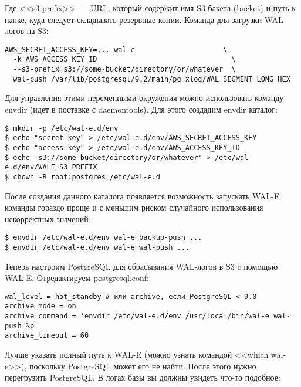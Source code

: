 Где <<s3-prefix>>~--- URL, который содержит имя S3 бакета (bucket) и путь к папке, куда следует складывать резервные копии. Команда для загрузки WAL-логов на S3:

\begin{lstlisting}[label=lst:wal-e4,caption=Загрузка WAL-логов на S3]
AWS_SECRET_ACCESS_KEY=... wal-e                     \
  -k AWS_ACCESS_KEY_ID                                \
  --s3-prefix=s3://some-bucket/directory/or/whatever  \
  wal-push /var/lib/postgresql/9.2/main/pg_xlog/WAL_SEGMENT_LONG_HEX
\end{lstlisting}

Для управления этими переменными окружения можно использовать команду envdir (идет в поставке с daemontools). Для этого создадим envdir каталог:

\begin{lstlisting}[label=lst:wal-e5,caption=WAL-E с envdir]
$ mkdir -p /etc/wal-e.d/env
$ echo "secret-key" > /etc/wal-e.d/env/AWS_SECRET_ACCESS_KEY
$ echo "access-key" > /etc/wal-e.d/env/AWS_ACCESS_KEY_ID
$ echo 's3://some-bucket/directory/or/whatever' > /etc/wal-e.d/env/WALE_S3_PREFIX
$ chown -R root:postgres /etc/wal-e.d
\end{lstlisting}

После создания данного каталога появляется возможность запускать WAL-E команды гораздо проще и с меньшим риском случайного использования некорректных значений:

\begin{lstlisting}[label=lst:wal-e6,caption=WAL-E с envdir]
$ envdir /etc/wal-e.d/env wal-e backup-push ...
$ envdir /etc/wal-e.d/env wal-e wal-push ...
\end{lstlisting}

Теперь настроим PostgreSQL для сбрасывания WAL-логов в S3 c помощью WAL-E. Отредактируем postgresql.conf:

\begin{lstlisting}[label=lst:wal-e7,caption=Настройка PostgreSQL]
wal_level = hot_standby # или archive, если PostgreSQL < 9.0
archive_mode = on
archive_command = 'envdir /etc/wal-e.d/env /usr/local/bin/wal-e wal-push %p'
archive_timeout = 60
\end{lstlisting}

Лучше указать полный путь к WAL-E (можно узнать командой <<which wal-e>>), поскольку PostgreSQL может его не найти. После этого нужно перегрузить PostgreSQL. В логах базы вы должны увидеть что-то подобное:

